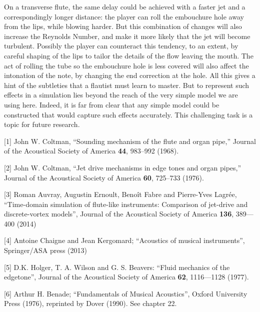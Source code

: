   On a transverse flute, the same delay could be achieved with a faster jet and 
  a correspondingly longer distance: the player can roll the embouchure hole 
  away from the lips, while blowing harder. But this combination of changes 
  will also increase the Reynolds Number, and make it more likely that the jet 
  will become turbulent. Possibly the player can counteract this tendency, to 
  an extent, by careful shaping of the lips to tailor the details of the flow 
  leaving the mouth. The act of rolling the tube so the embouchure hole is less 
  covered will also affect the intonation of the note, by changing the end 
  correction at the hole. All this gives a hint of the subtleties that a 
  flautist must learn to master. But to represent such effects in a simulation 
  lies beyond the reach of the very simple model we are using here. Indeed, it 
  is far from clear that any simple model could be constructed that would 
  capture such effects accurately. This challenging task is a topic for future 
  research. 



  \sectionreferences{}[1] John W. Coltman, “Sounding mechanism of the flute and 
  organ pipe,” Journal of the Acoustical Society of America \textbf{44}, 
  983–992 (1968). 

  [2] John W. Coltman, “Jet drive mechanisms in edge tones and organ pipes,” 
  Journal of the Acoustical Society of America \textbf{60}, 725–733 (1976). 

  [3] Roman Auvray, Augustin Ernoult, Benoît Fabre and Pierre-Yves Lagrée, 
  “Time-domain simulation of flute-like instruments: Comparison of jet-drive 
  and discrete-vortex models”, Journal of the Acoustical Society of America 
  \textbf{136}, 389—400 (2014) 

  [4] Antoine Chaigne and Jean Kergomard; “Acoustics of musical instruments”, 
  Springer/ASA press (2013) 

  [5] D.K. Holger, T. A. Wilson and G. S. Beavers: “Fluid mechanics of the 
  edgetone'', Journal of the Acoustical Society of America \textbf{62}, 
  1116—1128 (1977). 

  [6] Arthur H. Benade; “Fundamentals of Musical Acoustics”, Oxford University 
  Press (1976), reprinted by Dover (1990). See chapter 22. 